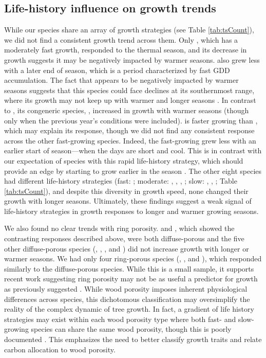 \subsection{Life-history influence on growth trends}
While our species share an array of growth strategies (see Table \ref{tab:tsCount}), we did not find a consistent growth trend across them. Only {\Ball}, which has a moderately fast growth, responded to the thermal season, and its decrease in growth suggests it may be negatively impacted by warmer seasons. {\Ball} also grew less with a later end of season, which is a period characterized by fast GDD accumulation. The fact that {\Ball} appears to be negatively impacted by warmer seasons suggests that this species could face declines at its southernmost range, where its growth may not keep up with warmer and longer seasons \citep{doak_demographic_2010,aitken_adaptation_2008}. In contrast to {\Ball}, its congeneric species, {\Bnig}, increased in growth with warmer seasons (though only when the previous year's conditions were included). {\Bnig} is faster growing than {\Ball}, which may explain its response, though we did not find any consistent response across the other fast-growing species. Indeed, the fast-growing {\Tame} \citep[Table \ref{tab:tsCount};][]{burns_silvics_1990} grew less with an earlier start of season---when the days are short and cool. This is in contrast with our expectation of species with this rapid life-history strategy, which should provide an edge by starting to grow earlier in the season \citep{loughnan_budburst_2025}. The other eight species had different life-history strategies (fast: {\Pdel}; moderate: {\Arub}, {\Afla}, {\Cova}, {\Qrub}; slow: {\Asac}, {\Cgla}, {\Qalb}; Table \ref{tab:tsCount}), and despite this diversity in growth speed, none changed their growth with longer seasons. Ultimately, these findings suggest a weak signal of life-history strategies in growth responses to longer and warmer growing seasons.

We also found no clear trends with ring porosity. {\Ball} and {\Bnig}, which showed the contrasting responses described above, were both diffuse-porous and the five other diffuse-porous species ({\Afla}, {\Arub}, {\Asac}, {\Pdel} and {\Tame}) did not increase growth with longer or warmer seasons. We had only four ring-porous species ({\Cgla}, {\Cova}, {\Qalb} and {\Qrub}), which responded similarly to the diffuse-porous species. While this is a small sample, it supports recent work \citep[e.g.,][]{grover_growth_2023} suggesting ring porosity may not be as useful a predictor for growth as previously suggested \citep{wang_relation_1992}. While wood porosity imposes inherent physiological differences across species, this dichotomous classification may oversimplify the reality of the complex dynamic of tree growth. In fact, a gradient of life history strategies may exist within each wood porosity type where both fast- and slow-growing species can share the same wood porosity, though this is poorly documented \citep{taneda_casestudy_2008}. This emphasizes the need to better classify growth traits and relate carbon allocation to wood porosity. 

